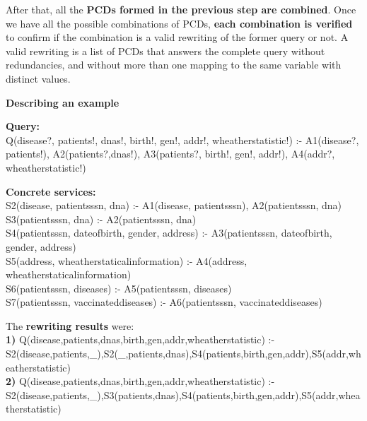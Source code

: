 \documentclass[12pt,a4paper,oneside]{report}
\begin{document}
After that, all the \textbf{PCDs formed in the previous step are combined}. Once we have all the possible combinations of PCDs, \textbf{each combination is verified} to confirm if the combination is a valid rewriting of the former query or not.
A valid rewriting is a list of PCDs that answers the complete query without redundancies, and without more than one mapping to the same variable with distinct values.

\begin{flushleft}
\textbf{Describing an example}
\end{flushleft}

\begin{flushleft}
\textbf{Query:} \\
Q(disease?, patients!, dnas!, birth!, gen!, addr!, wheatherstatistic!) :- A1(disease?, patients!), A2(patients?,dnas!), A3(patients?, birth!, gen!, addr!), A4(addr?, wheatherstatistic!) \\
\end{flushleft}

\begin{flushleft}
\textbf{Concrete services:} \\
S2(disease, patientsssn, dna) :- A1(disease, patientsssn), A2(patientsssn, dna)\\
S3(patientsssn, dna) :- A2(patientsssn, dna)\\
S4(patientsssn, dateofbirth, gender, address) :- A3(patientsssn, dateofbirth, gender, address)\\
S5(address, wheatherstaticalinformation) :- A4(address, wheatherstaticalinformation)\\
S6(patientsssn, diseases) :- A5(patientsssn, diseases)\\
S7(patientsssn, vaccinateddiseases) :- A6(patientsssn, vaccinateddiseases)\\
\end{flushleft}

\begin{flushleft}
The \textbf{rewriting results} were: \\
\textbf{1) }Q(disease,patients,dnas,birth,gen,addr,wheatherstatistic) :- S2(disease,patients,\_),S2(\_,patients,dnas),S4(patients,birth,gen,addr),S5(addr,wheatherstatistic) \\
\textbf{2) }Q(disease,patients,dnas,birth,gen,addr,wheatherstatistic) :- S2(disease,patients,\_),S3(patients,dnas),S4(patients,birth,gen,addr),S5(addr,wheatherstatistic)
\end{flushleft}
\end{document}
